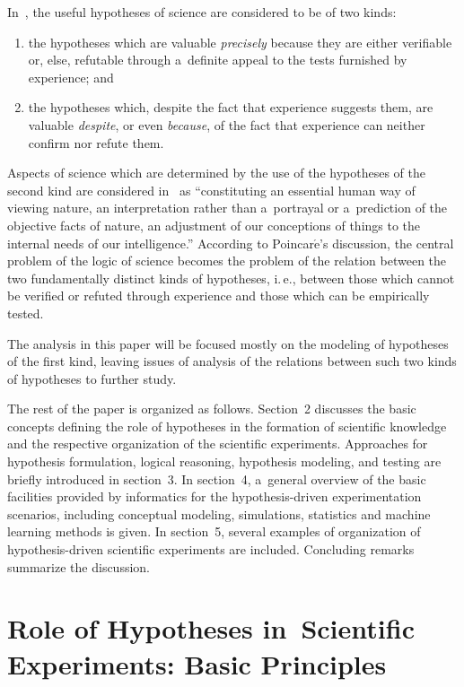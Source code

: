 \begin{multicols}{2}
  In~\cite{4-kl}, the useful hypotheses of science are considered to be of two kinds:
  \begin{enumerate}[(1)]
\item the hypotheses which are valuable \textit{precisely} because they are either
verifiable or, else, refutable through a~definite appeal to the tests furnished by
experience; and
\item the hypotheses which, despite the fact that experience suggests them, are
valuable \textit{despite}, or even \textit{because}, of the fact that experience can
neither confirm nor refute them.
\end{enumerate}

  Aspects of science which are determined by the use of the hypotheses of the
second kind are considered in~\cite{4-kl}
as ``constituting an essential human way of viewing nature, an interpretation rather
than a~portrayal or a~prediction of the objective facts of nature, an adjustment of our
conceptions of things to the internal needs of our intelligence.'' According to
Poincar$\acute{\mbox{e}}$'s discussion, the central problem of the logic of
science becomes the problem of the relation between the two fundamentally distinct
kinds of hypotheses, i.\,e., between those which cannot be verified or refuted through
experience and those which can be empirically tested.

  The analysis in this paper will be focused mostly on the modeling of hypotheses of
the first kind, leaving issues of analysis of the relations between such two kinds of
hypotheses to further study.

  The rest of the paper is organized as follows.  Section~2 discusses the basic
concepts defining the role of hypotheses in the formation of scientific knowledge and
the respective organization of the scientific experiments. Approaches for hypothesis
formulation, logical reasoning, hypothesis modeling, and testing are briefly
introduced in section~3. In section~4,
 a~general overview of the basic facilities provided by
informatics for the hypothesis-driven experimentation scenarios, including conceptual
modeling, simulations, statistics and machine learning methods is given. In
section~5, several examples of organization of hypothesis-driven scientific
experiments are included. Concluding remarks summarize the discussion.

\section{Role of Hypotheses in~Scientific Experiments: Basic Principles}


\end{multicols}
